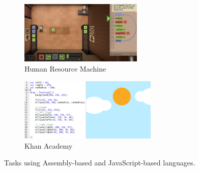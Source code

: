 \begin{figure}[htb]
\centering
\begin{subfigure}[t]{0.48\textwidth}
\centering
\includegraphics[height=30mm]{img/human-resource-machine}
\caption{Human Resource Machine\protect\footnotemark}
\label{fig:hrm}
\end{subfigure}%
\begin{subfigure}[t]{0.52\textwidth}
\centering
\includegraphics[height=30mm]{img/khan-academy}
\caption{Khan Academy}
\label{fig:ka}
\end{subfigure}
\caption{Tasks using Assembly-based and JavaScript-based languages.}
\label{fig:hrm-ka}
\end{figure}






%



